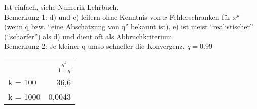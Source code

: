 \beweis Ist einfach, siehe Numerik Lehrbuch.\\
Bemerkung 1: d) und e) leifern ohne Kenntnis von $x$ Fehlerschranken für $x^k$ (wenn q bzw. ``eine Abschätzung von q'' bekannt ist).
e) ist meist ``realistischer'' (``schärfer'') als d) und dient oft als Abbruchkriterium.\\
Bemerkung 2: Je kleiner q umso schneller die Konvergenz. $q = 0.99$\\
\begin{tabular}{l | r}
           & $\frac{q^k}{1-q}$ \\
  k = 100  & 36,6 \\
  k = 1000 & 0,0043
\end{tabular}






















